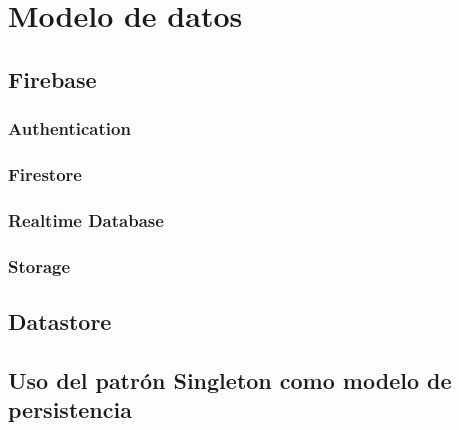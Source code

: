 \chapter{Modelo de datos}
\label{cap:modeloDeDatos}
\section{Firebase}
\subsection{Authentication}
\subsection{Firestore}
\subsection{Realtime Database}
\subsection{Storage}
\section{Datastore}
\section{Uso del patrón Singleton como modelo de persistencia}
